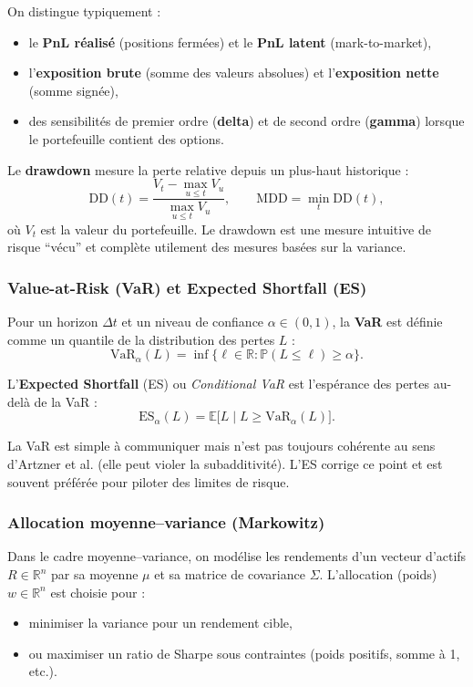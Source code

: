\documentclass[11pt,a4paper]{article}
\newcommand{\1}{\mathbf{1}}
\begin{document}
On distingue typiquement :
\begin{itemize}
  \item le \textbf{PnL r\'ealis\'e} (positions ferm\'ees) et le \textbf{PnL latent} (mark-to-market),
  \item l'\textbf{exposition brute} (somme des valeurs absolues) et l'\textbf{exposition nette} (somme sign\'ee),
  \item des sensibilit\'es de premier ordre (\textbf{delta}) et de second ordre (\textbf{gamma}) lorsque le portefeuille
        contient des options.
\end{itemize}

Le \textbf{drawdown} mesure la perte relative depuis un plus-haut historique :
\[
\mathrm{DD}(t)=\frac{V_t-\max_{u\le t}V_u}{\max_{u\le t}V_u},
\qquad
\mathrm{MDD}=\min_t \mathrm{DD}(t),
\]
où $V_t$ est la valeur du portefeuille. Le drawdown est une mesure intuitive de risque ``v\'ecu'' et compl\`ete utilement
des mesures bas\'ees sur la variance.

\subsubsection{Value-at-Risk (VaR) et Expected Shortfall (ES)}

Pour un horizon $\Delta t$ et un niveau de confiance $\alpha\in(0,1)$, la \textbf{VaR} est d\'efinie comme un quantile
de la distribution des pertes $L$ :
\[
\mathrm{VaR}_\alpha(L)=\inf\{\ell\in\mathbb{R}:\mathbb{P}(L\le \ell)\ge \alpha\}.
\]

L'\textbf{Expected Shortfall} (ES) ou \emph{Conditional VaR} est l'esp\'erance des pertes au-del\`a de la VaR :
\[
\mathrm{ES}_\alpha(L)=\mathbb{E}\big[L\mid L\ge \mathrm{VaR}_\alpha(L)\big].
\]

La VaR est simple \`a communiquer mais n'est pas toujours coh\'erente au sens d'Artzner et al. (elle peut violer la
subadditivit\'e). L'ES corrige ce point et est souvent pr\'ef\'er\'ee pour piloter des limites de risque.

\subsubsection{Allocation moyenne--variance (Markowitz)}

Dans le cadre moyenne--variance, on mod\'elise les rendements d'un vecteur d'actifs $R\in\mathbb{R}^n$ par sa moyenne
$\mu$ et sa matrice de covariance $\Sigma$. L'allocation (poids) $w\in\mathbb{R}^n$ est choisie pour :
\begin{itemize}
  \item minimiser la variance pour un rendement cible,
  \item ou maximiser un ratio de Sharpe sous contraintes (poids positifs, somme \`a 1, etc.).
\end{itemize}
\end{document}
